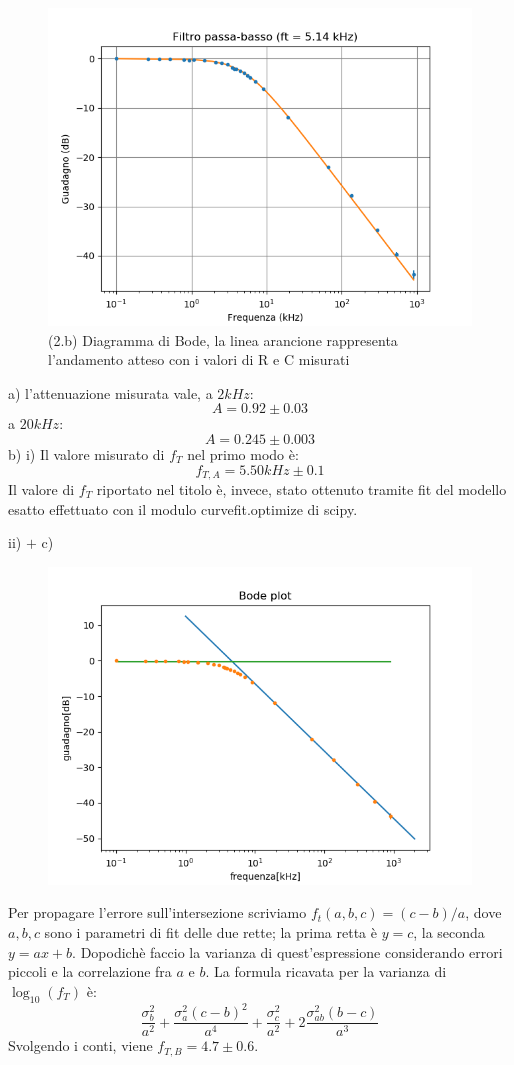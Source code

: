 \documentclass[10pt,a4paper]{article}
\begin{document}
\begin{figure}[h]
	\centering
	\includegraphics[scale=0.5]{Figure_0.png}

	
	\caption{(2.b) Diagramma di Bode, la linea arancione rappresenta l'andamento atteso con i valori di R e C misurati \label{f:par1}}
\end{figure}
a) l'attenuazione misurata vale, a $2kHz$:
\[A=0.92\pm0.03\]
a $20kHz$:
\[A=0.245\pm0.003\]
b)
    i) Il valore misurato di $f_T$ nel primo modo è: \[f_{T,A}=5.50kHz\pm0.1\]
     Il valore di $f_T$ riportato nel titolo è, invece, stato ottenuto tramite fit del modello esatto effettuato con il modulo curvefit.optimize di scipy.

	ii) $+$ c) 
\begin{figure}[h]
	\centering
	\includegraphics[scale=0.6]{Figure_2.png}
\end{figure}
Per propagare l'errore sull'intersezione scriviamo $f_t(a,b,c)=(c-b)/a$, dove $a,b,c$ sono i parametri di fit delle due rette; la prima retta è $y=c$, la seconda $y=ax+b$. Dopodichè faccio la varianza di quest'espressione considerando errori piccoli e la correlazione fra $a$ e $b$.
La formula ricavata per la varianza di $\log_{10}(f_T)$ è:\[\frac{\sigma_{b}^2}{a^2}+\frac{\sigma^2_a(c-b)^2}{a^4}+\frac{\sigma^2_c}{a^2}+2\frac{\sigma_{ab}^2(b-c)}{a^3}\]
Svolgendo i conti, viene $f_{T,B}=4.7\pm0.6$.
\end{document}
